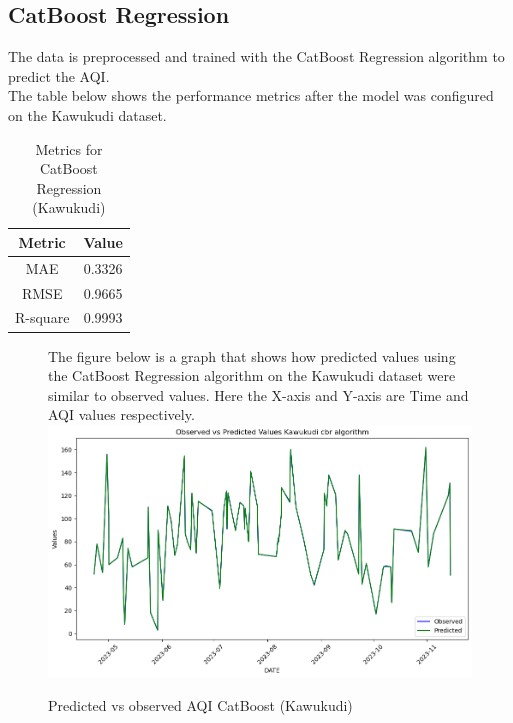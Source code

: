 \documentclass{book}
\numberwithin{equation}{section}
\numberwithin{figure}{section}
\begin{document}
\subsection{CatBoost Regression}
The data is preprocessed and trained with the CatBoost Regression algorithm to predict the AQI. \\The table below shows the performance metrics after the model was configured on the Kawukudi dataset.
\begin{table}[H]
    \centering
    \begin{tabular}{|c|c|}
        \hline
        \textbf{Metric} & \textbf{Value} \\
        \hline
        MAE & 0.3326 \\
        \hline
        RMSE & 0.9665 \\
        \hline
        R-square & 0.9993\\
        \hline
    \end{tabular}
    \caption{Metrics for CatBoost Regression (Kawukudi)}
    \label{tab: CBR metrics(Kawukudi)}
\end{table}
\begin{figure}[H]
 \begin{minipage}{\linewidth}
        The figure below is a graph that shows how predicted values using the CatBoost Regression algorithm on the Kawukudi dataset were similar to observed values. Here the X-axis and Y-axis are Time and AQI values respectively.
        \vspace{0.5em} 
        \includegraphics[width=\linewidth]{kawukudi cbr.png}
       
        \caption{ Predicted vs observed AQI CatBoost (Kawukudi) }
        \label{fig: CBR predicted vs observed AQI(Kawukudi)}
    \end{minipage}
\end{figure}
\vspace{-5mm}
\end{document}
